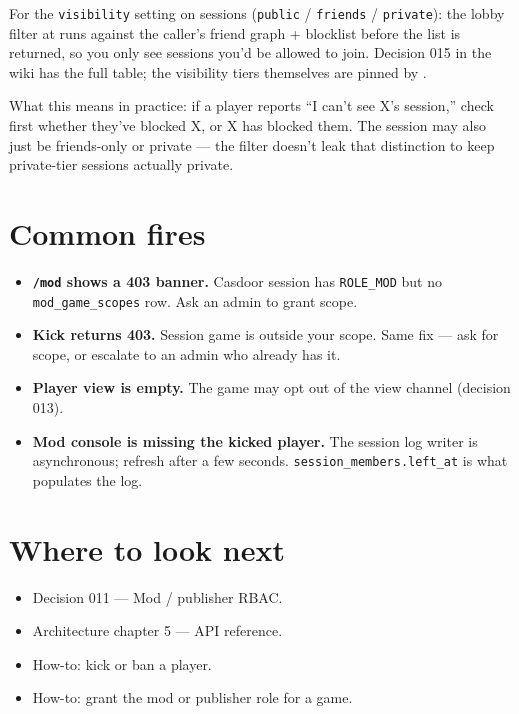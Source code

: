 \documentclass[11pt,a4paper,openany]{book}
\begin{document}
For the \texttt{visibility} setting on sessions
(\texttt{public} / \texttt{friends} / \texttt{private}): the
lobby filter at  runs
against the caller's friend graph + blocklist before the list is
returned, so you only see sessions you'd be allowed to join. Decision
015 in the wiki has the full table; the visibility tiers themselves
are pinned by .

What this means in practice: if a player reports
``I can't see X's session,'' check first whether they've blocked X,
or X has blocked them. The session may also just be friends-only
or private --- the filter doesn't leak that distinction to keep
private-tier sessions actually private.

\chapter{Common fires}
\begin{itemize}
  \item \textbf{\texttt{/mod} shows a 403 banner.} Casdoor session has
        \texttt{ROLE\_MOD} but no \texttt{mod\_game\_scopes} row. Ask
        an admin to grant scope.
  \item \textbf{Kick returns 403.} Session game is outside your
        scope. Same fix --- ask for scope, or escalate to an admin who
        already has it.
  \item \textbf{Player view is empty.} The game may opt out of the
        view channel (decision 013).
  \item \textbf{Mod console is missing the kicked player.} The session
        log writer is asynchronous; refresh after a few seconds.
        \texttt{session\_members.left\_at} is what populates the log.
\end{itemize}

\chapter{Where to look next}
\begin{itemize}
  \item Decision 011 --- Mod / publisher RBAC.
  \item Architecture chapter 5 --- API reference.
  \item How-to: kick or ban a player.
  \item How-to: grant the mod or publisher role for a game.
\end{itemize}
\end{document}
